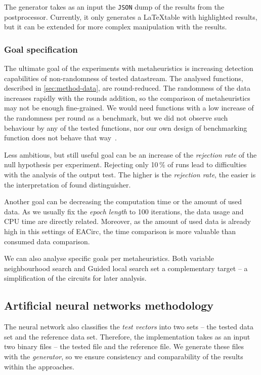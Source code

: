 \documentclass[
    digital,    %
    oneside,    %
    color,
    11pt,
    nocover,
    notable,
    nolof,
    nolot,
]{fithesis3}
\begin{document}
The generator takes as an input the \texttt{JSON} dump of the results from the postprocessor. Currently, it only generates a \LaTeX table with highlighted results, but it can be extended for more complex manipulation with the results.

\subsubsection{\textbf{Goal specification}}
\label{subsubsec:method-spec-ss-goal}

The ultimate goal of the experiments with metaheuristics is increasing detection capabilities of non-randomness of tested datastream. The analysed functions, described in \cref{sec:method-data}, are round-reduced. The randomness of the data increases rapidly with the rounds addition, so the comparison of metaheuristics may not be enough fine-grained. We would need functions with a low increase of the randomness per round as a benchmark, but we did not observe such behaviour by any of the tested functions, nor our own design of benchmarking function does not behave that way~\cite{EACirc-lut}.

Less ambitious, but still useful goal can be an increase of the \textit{rejection rate} of the null hypothesis per experiment. Rejecting only 10\,\% of runs lead to difficulties with the analysis of the output test. The higher is the \textit{rejection rate}, the easier is the interpretation of found distinguisher.

Another goal can be decreasing the computation time or the amount of used data. As we usually fix the \textit{epoch length} to 100 iterations, the data usage and CPU time are directly related. Moreover, as the amount of used data is already high in this settings of EACirc, the time comparison is more valuable than consumed data comparison.

We can also analyse specific goals per metaheuristics. Both variable neighbourhood search and Guided local search set a complementary target -- a simplification of the circuits for later analysis.

\subsection{Artificial neural networks methodology}
\label{subsubsec:method-spec-ms-aco}

The neural network also classifies the \textit{test vectors} into two sets -- the tested data set and the reference data set. Therefore, the implementation takes as an input two binary files -- the tested file and the reference file. We generate these files with the \textit{generator}, so we ensure consistency and comparability of the results within the approaches.
\end{document}
